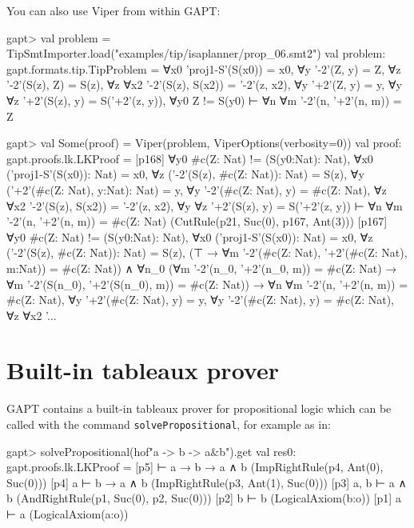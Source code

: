 \documentclass[a4paper,11pt]{book}
\begin{document}
You can also use Viper from within GAPT:
\begin{clilisting}
gapt> val problem = TipSmtImporter.load("examples/tip/isaplanner/prop_06.smt2")
val problem: gapt.formats.tip.TipProblem =
∀x0 'proj1-S'(S(x0)) = x0,
∀y '-2'(Z, y) = Z,
∀z '-2'(S(z), Z) = S(z),
∀z ∀x2 '-2'(S(z), S(x2)) = '-2'(z, x2),
∀y '+2'(Z, y) = y,
∀y ∀z '+2'(S(z), y) = S('+2'(z, y)),
∀y0 Z != S(y0)
⊢
∀n ∀m '-2'(n, '+2'(n, m)) = Z

gapt> val Some(proof) = Viper(problem, ViperOptions(verbosity=0))
val proof: gapt.proofs.lk.LKProof =
[p168] ∀y0 #c(Z: Nat) != (S(y0:Nat): Nat),
∀x0 ('proj1-S'(S(x0)): Nat) = x0,
∀z ('-2'(S(z), #c(Z: Nat)): Nat) = S(z),
∀y ('+2'(#c(Z: Nat), y:Nat): Nat) = y,
∀y '-2'(#c(Z: Nat), y) = #c(Z: Nat),
∀z ∀x2 '-2'(S(z), S(x2)) = '-2'(z, x2),
∀y ∀z '+2'(S(z), y) = S('+2'(z, y))
⊢
∀n ∀m '-2'(n, '+2'(n, m)) = #c(Z: Nat)    (CutRule(p21, Suc(0), p167, Ant(3)))
[p167] ∀y0 #c(Z: Nat) != (S(y0:Nat): Nat),
∀x0 ('proj1-S'(S(x0)): Nat) = x0,
∀z ('-2'(S(z), #c(Z: Nat)): Nat) = S(z),
(⊤ → ∀m '-2'(#c(Z: Nat), '+2'(#c(Z: Nat), m:Nat)) = #c(Z: Nat)) ∧
    ∀n_0
    (∀m '-2'(n_0, '+2'(n_0, m)) = #c(Z: Nat) →
      ∀m '-2'(S(n_0), '+2'(S(n_0), m)) = #c(Z: Nat)) →
  ∀n ∀m '-2'(n, '+2'(n, m)) = #c(Z: Nat),
∀y '+2'(#c(Z: Nat), y) = y,
∀y '-2'(#c(Z: Nat), y) = #c(Z: Nat),
∀z ∀x2 '...

\end{clilisting}

\section{Built-in tableaux prover}

GAPT contains a built-in tableaux prover for propositional logic
which can be called with the command \texttt{solvePropositional}, for example as in:
\begin{clilisting}
gapt> solvePropositional(hof"a -> b -> a&b").get
val res0: gapt.proofs.lk.LKProof =
[p5]  ⊢ a → b → a ∧ b    (ImpRightRule(p4, Ant(0), Suc(0)))
[p4] a ⊢ b → a ∧ b    (ImpRightRule(p3, Ant(1), Suc(0)))
[p3] a, b ⊢ a ∧ b    (AndRightRule(p1, Suc(0), p2, Suc(0)))
[p2] b ⊢ b    (LogicalAxiom(b:o))
[p1] a ⊢ a    (LogicalAxiom(a:o))

\end{clilisting}
\end{document}
